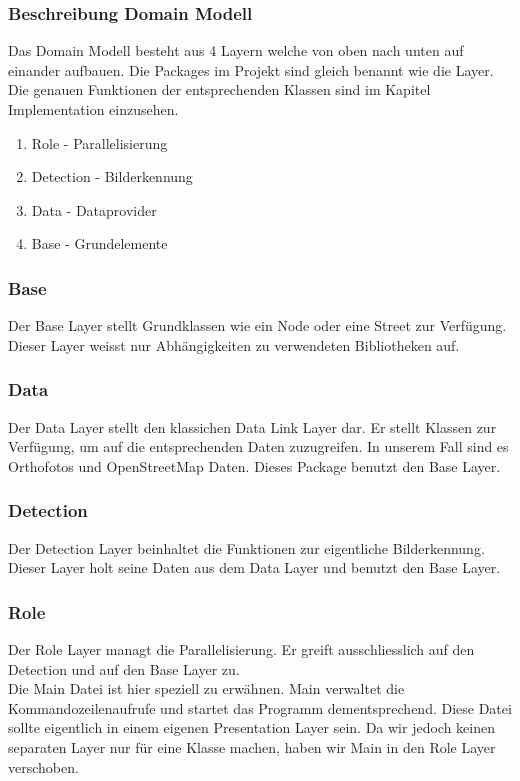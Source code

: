 \subsubsection{Beschreibung Domain Modell}
Das Domain Modell besteht aus 4 Layern welche von oben nach unten auf einander aufbauen. Die Packages im Projekt sind gleich benannt wie die Layer. Die genauen Funktionen der entsprechenden Klassen sind im Kapitel Implementation einzusehen.
\begin{enumerate}
	\item Role - Parallelisierung
	\item Detection - Bilderkennung
	\item Data - Dataprovider
	\item Base - Grundelemente
\end{enumerate}

\subsubsection{Base}
Der Base Layer stellt Grundklassen wie ein Node oder eine Street zur Verfügung. Dieser Layer weisst nur Abhängigkeiten zu verwendeten Bibliotheken auf.

\subsubsection{Data}
Der Data Layer stellt den klassichen Data Link Layer dar. Er stellt Klassen zur Verfügung, um auf die entsprechenden Daten zuzugreifen. In unserem Fall sind es Orthofotos und OpenStreetMap Daten. Dieses Package benutzt den Base Layer.

\subsubsection{Detection}
Der Detection Layer beinhaltet die Funktionen zur eigentliche Bilderkennung. Dieser Layer holt seine Daten aus dem Data Layer und benutzt den Base Layer.

\subsubsection{Role}
Der Role Layer managt die Parallelisierung. Er greift ausschliesslich auf den Detection und auf den Base Layer zu.
\\
Die Main Datei ist hier speziell zu erwähnen. Main verwaltet die Kommandozeilenaufrufe und startet das Programm dementsprechend. Diese Datei sollte eigentlich in einem eigenen Presentation Layer sein. Da wir jedoch keinen separaten Layer nur für eine Klasse machen, haben wir Main in den Role Layer verschoben.
